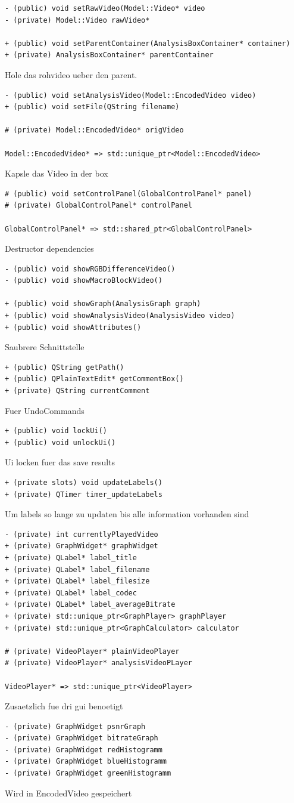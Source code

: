 \documentclass[parskip=full]{scrartcl}
\begin{document}
\begin{verbatim}
- (public) void setRawVideo(Model::Video* video
- (private) Model::Video rawVideo*

+ (public) void setParentContainer(AnalysisBoxContainer* container)
+ (private) AnalysisBoxContainer* parentContainer
\end{verbatim}
Hole das rohvideo ueber den parent.

\begin{verbatim}
- (public) void setAnalysisVideo(Model::EncodedVideo video)
+ (public) void setFile(QString filename)

# (private) Model::EncodedVideo* origVideo

Model::EncodedVideo* => std::unique_ptr<Model::EncodedVideo>
\end{verbatim}
Kapsle das Video in der box
\begin{verbatim}
# (public) void setControlPanel(GlobalControlPanel* panel)
# (private) GlobalControlPanel* controlPanel

GlobalControlPanel* => std::shared_ptr<GlobalControlPanel>
\end{verbatim}
Destructor dependencies

\begin{verbatim}
- (public) void showRGBDifferenceVideo()
- (public) void showMacroBlockVideo()

+ (public) void showGraph(AnalysisGraph graph)
+ (public) void showAnalysisVideo(AnalysisVideo video)
+ (public) void showAttributes()
\end{verbatim}
Saubrere Schnittstelle
\begin{verbatim}
+ (public) QString getPath()
+ (public) QPlainTextEdit* getCommentBox()
+ (private) QString currentComment
\end{verbatim}
Fuer UndoCommands
\begin{verbatim}
+ (public) void lockUi()
+ (public) void unlockUi()
\end{verbatim}
Ui locken fuer das save results
\begin{verbatim}
+ (private slots) void updateLabels()
+ (private) QTimer timer_updateLabels
\end{verbatim}
Um labels so lange zu updaten bis alle information vorhanden sind
\begin{verbatim}
- (private) int currentlyPlayedVideo
+ (private) GraphWidget* graphWidget
+ (private) QLabel* label_title
+ (private) QLabel* label_filename
+ (private) QLabel* label_filesize
+ (private) QLabel* label_codec
+ (private) QLabel* label_averageBitrate
+ (private) std::unique_ptr<GraphPlayer> graphPlayer
+ (private) std::unique_ptr<GraphCalculator> calculator

# (private) VideoPlayer* plainVideoPlayer
# (private) VideoPlayer* analysisVideoPLayer

VideoPlayer* => std::unique_ptr<VideoPlayer>
\end{verbatim}
Zusaetzlich fue dri gui benoetigt
\begin{verbatim}
- (private) GraphWidget psnrGraph
- (private) GraphWidget bitrateGraph
- (private) GraphWidget redHistogramm
- (private) GraphWidget blueHistogramm
- (private) GraphWidget greenHistogramm
\end{verbatim}
Wird in EncodedVideo gespeichert
\end{document}
